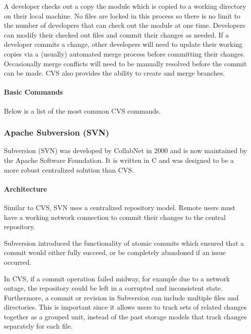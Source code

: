 A developer checks out a copy the module which is copied to a working directory on their local machine. No files are locked in this process so there is no limit to the number of developers that can check out the module at one time. Developers can modify their checked out files and commit their changes as needed. If a developer commits a change, other developers will need to update their working copies via a (usually) automated merge process before committing their changes. Occasionally merge conflicts will need to be manually resolved before the commit can be made. CVS also provides the ability to create and merge branches.

\paragraph{Basic Commands}

Below is a list of the most common CVS commands.

\subsubsection{Apache Subversion (SVN)}
Subversion (SVN) was developed by CollabNet in 2000 and is now maintained by the Apache Software Foundation. It is written in C and was designed to be a more robust centralized solution than CVS.
\paragraph{Architecture}
Similar to CVS, SVN uses a centralized repository model. Remote users must have a working network connection to commit their changes to the central repository.

Subversion introduced the functionality of atomic commits which ensured that a commit would either fully succeed, or be completely abandoned if an issue occurred.

In CVS, if a commit operation failed midway, for example due to a network outage, the repository could be left in a corrupted and inconsistent state. Furthermore, a commit or revision in Subversion can include multiple files and directories. This is important since it allows users to track sets of related changes together as a grouped unit, instead of the past storage models that track changes separately for each file.

